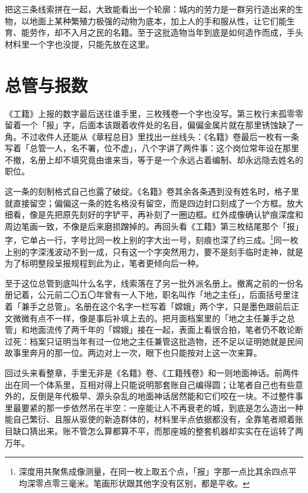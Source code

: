 把这三条线索拼在一起，大致能看出一个轮廓：城内的劳力是一群另行造出来的生物，以地面上某种繁殖力极强的动物为底本，加上人的手和服从性，让它们能生育、能劳作，却不入月之民的名籍。至于这批造物当年到底是如何造作而成，手头材料里一个字也没提，只能先放在这里。

\section{总管与报数}

《工籍》上报的数字最后送往谁手里，三枚残卷一个字也没写。第三枚行末孤零零留着一个「报」字，后面本该跟着收件处的名目，偏偏金属片就在那里锈蚀缺了一角。不过收件人还能从《章程总目》里找出一丝线头：《名籍》卷最后一枚有一条写着「总管一人，名不署，位不虚」，八个字讲了两件事：这个岗位常年设在那里不撤，名册上却不填究竟由谁来当，等于是一个永远占着编制、却永远隐去姓名的职位。

这一条的刻制格式自己也露了破绽。《名籍》卷其余各条遇到没有姓名时，格子里就直接留空；偏偏这一条的姓名格没有留空，而是四边封口刻成了一个方框。放大细看，像是先把原先刻好的字铲平，再补刻了一圈边框。红外成像确认铲痕深度和周边笔画一致，不像是后来磨损蹭掉的。再回头看《工籍》第三枚结尾那个「报」字，它单占一行，字号比同一枚上别的字大出一号，刻痕也深了约三成。\footnote{深度用共聚焦成像测量，在同一枚上取五个点，「报」字那一点比其余四点平均深零点零三毫米。笔画形状跟其他字没有区别，都是平收。}同一枚上别的字深浅波动不到一成，只有这一个字突然用力，要不是刻手临时走神，就是为了标明整段呈报规程到此为止，笔者更倾向后一种。

至于这位总管到底叫什么名字，线索落在了另一批外派名册上。撤离之前的一份名册记着，公元前二〇五〇年曾有一人下地，职名叫作「地之主任」，后面括号里注着「兼手之总管」。名册在这个名字一栏写着「嫦娥」两个字，只是墨色跟前后正文微微有点不一样，像是事后补填上去的。把月面档案里的「地之主任兼手之总管」和地面流传了两千年的「嫦娥」接在一起，表面上看很合拍，笔者仍不敢论断过死：档案只证明当年有过一位地之主任兼管这批造物，还不足以证明她就是民间故事里奔月的那一位。两边对上一次，眼下也只能按对上这一次来算。

回过头来看整章，手里无非是《名籍》卷、《工籍残卷》和一则地面神话。前两件出在同一个体系里，互相对得上只能说明那套账自己编得圆；让笔者自己也有些意外的，反倒是年代极早、源头杂乱的地面神话居然能和它们咬在一块。不过整件事里最要紧的那一步依然吊在半空：一座能让人不再衰老的城，到底是怎么造出一种能自己繁衍、且服从驱使的新造群体的，材料里半点依据都没有，全靠笔者顺着账目缺口猜出来。账不管怎么算都算不平，而那座城的整套机器却实实在在运转了两万年。
